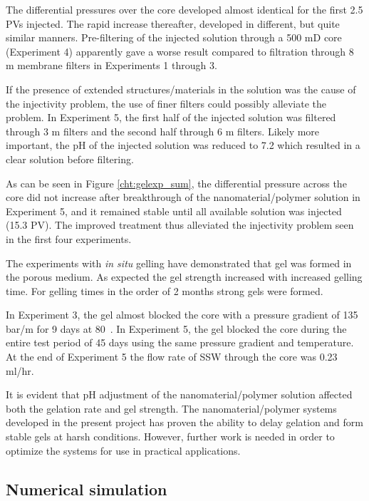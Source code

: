\documentclass[nanomaterials,article,submit,moreauthors,pdftex]{Definitions/mdpi}
\begin{document}
The differential pressures over the core developed almost identical for the first 2.5 PVs injected. The rapid increase thereafter, developed in different, but quite similar manners. Pre-filtering of the injected solution through a 500 mD core (Experiment 4) apparently gave a worse result compared to filtration through 8 \micro m membrane filters in Experiments 1 through 3.

If the presence of extended structures/materials in the solution was the cause of the injectivity problem, the use of finer filters could possibly alleviate the problem. In Experiment 5, the first half of the injected solution was filtered through 3 \micro m filters and the second half through 6 \micro m filters. Likely more important, the pH of the injected solution was reduced to 7.2 which resulted in a clear solution before filtering. 

As can be seen in Figure \ref{cht:gelexp_sum}, the differential pressure across the core did not increase after breakthrough of the nanomaterial/polymer solution in Experiment 5, and it remained stable until all available solution was injected (15.3 PV). The improved treatment thus alleviated the injectivity problem seen in the first four experiments.

The experiments with \textit{in situ} gelling have demonstrated that gel was formed in the porous medium. As expected the gel strength increased with increased gelling time. For gelling times in the order of 2 months strong gels were formed. 

In Experiment 3, the gel almost blocked the core with a pressure gradient of 135 bar/m for 9 days at 80~\celsius. In Experiment 5, the gel blocked the core during the entire test period of 45 days using the same pressure gradient and temperature. At the end of Experiment 5 the flow rate of SSW through the core was 0.23 ml/hr. 

It is evident that pH adjustment of the nanomaterial/polymer solution affected both the gelation rate and gel strength. The nanomaterial/polymer systems developed in the present project has proven the ability to delay gelation and form stable gels at harsh conditions. However, further work is needed in order to optimize the systems for use in practical applications. 

\subsection{Numerical simulation}
\end{document}
